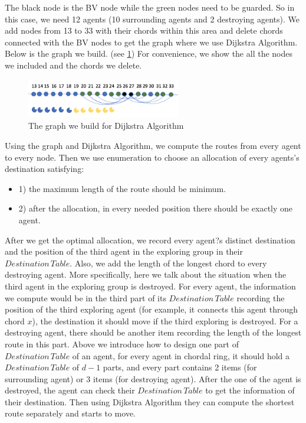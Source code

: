 The black node is the BV node while the green nodes need to be guarded. So in this case, we need 12 agents (10 surrounding agents and 2 destroying agents). 
We add nodes from 13 to 33 with their chords within this area and delete chords connected with the BV nodes to get the graph where we use Dijkstra Algorithm. Below is the graph we build. (see \ref{fig:D2}) For convenience, we show the all the nodes we included and the chords we delete.
\begin{figure}[H]
  \centering  
  \includegraphics[width=0.6\textwidth]{figures/D2.png}
  \caption{The graph we build for Dijkstra Algorithm}\label{fig:D2}
\end{figure} 
Using the graph and Dijkstra Algorithm, we compute the routes from every agent to every node. Then we use enumeration to choose an allocation of every agents's destination satisfying: 
\begin{itemize}
\item 1) the maximum length of the route should be minimum. 
\item 2) after the allocation, in every needed position there should be exactly one agent.
\end{itemize}
After we get the optimal allocation, we record every agent?s distinct destination and the position of the third agent in the exploring group in their $Destination\,Table$. Also, we add the length of the longest chord to every destroying agent.
More specifically, here we talk about the situation when the third agent in the exploring group is destroyed. For every agent, the information we compute would be in the third part of its $Destination\,Table$ recording the position of the third exploring agent (for example, it connects this agent through chord $x$), the destination it should move if the third exploring is destroyed. For a destroying agent, there should be another item recording the length of the longest route in this part.
Above we introduce how to design one part of $Destination\,Table$ of an agent, for every agent in chordal ring, it should hold a $Destination\,Table$ of $d-1$ parts, and every part contains 2 items (for surrounding agent) or 3 items (for destroying agent).
After the one of the agent is destroyed, the agent can check their $Destination\,Table$ to get the information of their destination. Then using Dijkstra Algorithm they can compute the shortest route separately and starts to move.


 
